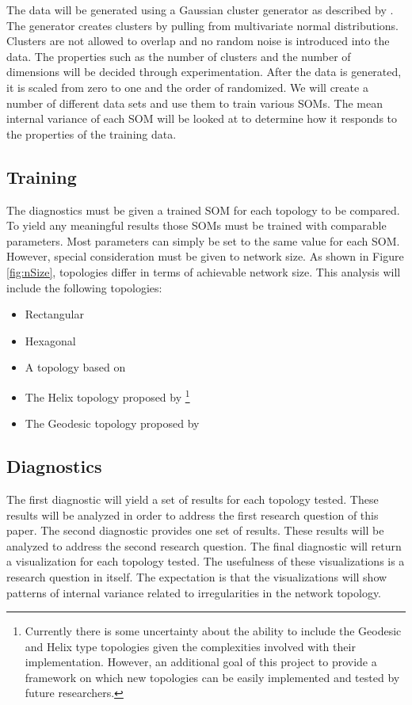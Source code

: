 The data will be generated using a Gaussian cluster generator as described by
\cite{handl}. The generator creates clusters by pulling from multivariate
normal distributions.  Clusters are not allowed to overlap and no random noise
is introduced into the data.  The properties such as the number of clusters
and the number of dimensions will be decided through experimentation.  After
the data is generated, it is scaled from zero to one and the order of
randomized.  We will create a number of different data sets and use them to
train various SOMs.  The mean internal variance of each SOM will be looked at
to determine how it responds to the properties of the training data.

\subsection{Training}
The diagnostics must be given a trained SOM for each topology to be compared. To
yield any meaningful results those SOMs must be trained with comparable
parameters. Most parameters can simply be set to the same value for each SOM.
However, special consideration must be given to network size.  As shown in
Figure \ref{fig:nSize}, topologies differ in terms of achievable network size.
This analysis will include the following topologies:
\begin{itemize}
\item Rectangular
\item Hexagonal
\item A topology based on \cite{Rakhmanov94}
\item The Helix topology proposed by \cite{Nishio:2006fk}\footnote{Currently
there is some uncertainty about the ability to include the Geodesic and Helix
type topologies given the complexities involved with their implementation.
However, an additional goal of this project to provide a framework on which new
topologies can be easily implemented and tested by future researchers.}
\item The Geodesic topology proposed by \cite{wu2006}\footnotemark[2]
\end{itemize}

\subsection{Diagnostics}
The first diagnostic will yield a set of results for each topology tested.  These
results will be analyzed in order to address the first research question of this
paper.  The second diagnostic provides one set of results.  These results will
be analyzed to address the second research question.  The final diagnostic will
return a visualization for each topology tested.  The usefulness of these
visualizations is a research question in itself.  The expectation is that the
visualizations will show patterns of internal variance related to irregularities
in the network topology.

